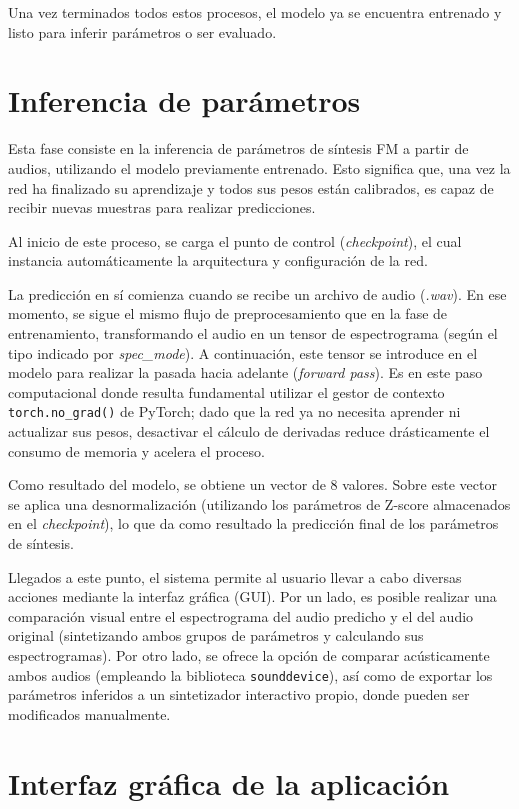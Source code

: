 Una vez terminados todos estos procesos, el modelo ya se encuentra entrenado y listo para inferir parámetros o ser evaluado.

\section{Inferencia de parámetros} 

Esta fase consiste en la inferencia de parámetros de síntesis FM a partir de audios, utilizando el modelo previamente entrenado. Esto significa que, una vez la red ha finalizado su aprendizaje y todos sus pesos están calibrados, es capaz de recibir nuevas muestras para realizar predicciones. 

Al inicio de este proceso, se carga el punto de control (\textit{checkpoint}), el cual instancia automáticamente la arquitectura y configuración de la red. 

La predicción en sí comienza cuando se recibe un archivo de audio (\textit{.wav}). En ese momento, se sigue el mismo flujo de preprocesamiento que en la fase de entrenamiento, transformando el audio en un tensor de espectrograma (según el tipo indicado por \textit{spec\_mode}). A continuación, este tensor se introduce en el modelo para realizar la pasada hacia adelante (\textit{forward pass}). Es en este paso computacional donde resulta fundamental utilizar el gestor de contexto \texttt{torch.no\_grad()} de PyTorch; dado que la red ya no necesita aprender ni actualizar sus pesos, desactivar el cálculo de derivadas reduce drásticamente el consumo de memoria y acelera el proceso.

Como resultado del modelo, se obtiene un vector de 8 valores. Sobre este vector se aplica una desnormalización (utilizando los parámetros de Z-score almacenados en el \textit{checkpoint}), lo que da como resultado la predicción final de los parámetros de síntesis.

Llegados a este punto, el sistema permite al usuario llevar a cabo diversas acciones mediante la interfaz gráfica (GUI). Por un lado, es posible realizar una comparación visual entre el espectrograma del audio predicho y el del audio original (sintetizando ambos grupos de parámetros y calculando sus espectrogramas). Por otro lado, se ofrece la opción de comparar acústicamente ambos audios (empleando la biblioteca \texttt{sounddevice}), así como de exportar los parámetros inferidos a un sintetizador interactivo propio, donde pueden ser modificados manualmente.

\section{Interfaz gráfica de la aplicación}

